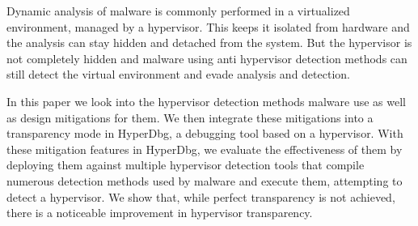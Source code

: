 Dynamic analysis of malware is commonly performed in a virtualized environment, managed by a hypervisor. 
This keeps it isolated from hardware and the analysis can stay hidden and detached from the system. But the hypervisor is not completely hidden and malware using anti hypervisor 
detection methods can still detect the virtual environment and evade analysis and detection. 

In this paper we look into the hypervisor detection methods malware use as well as design mitigations for them.  
We then integrate these mitigations into a transparency mode in HyperDbg, a debugging tool based on a hypervisor. With these mitigation features in HyperDbg, 
we evaluate the effectiveness of them by deploying them against multiple hypervisor detection tools that compile numerous detection methods used by malware and execute them, 
attempting to detect a hypervisor. We show that, while perfect transparency is not achieved, there is a noticeable improvement in hypervisor transparency.



